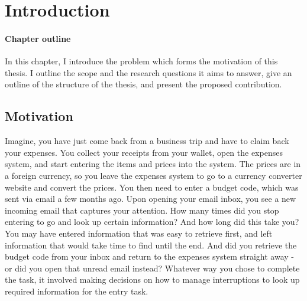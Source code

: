 \chapter{Introduction}

\begin{mynote}
\subsubsection{Chapter outline}
In this chapter, I introduce the problem which forms the motivation of this thesis. I outline the scope and the research questions it aims to answer, give an outline of the structure of the thesis, and present the proposed contribution.
\end{mynote}

\vspace{10pt}

\section{Motivation}

Imagine, you have just come back from a business trip and have to claim back your expenses. You collect your receipts from your wallet, open the expenses system, and start entering the items and prices into the system. The prices are in a foreign currency, so you leave the expenses system to go to a currency converter website and convert the prices. You then need to enter a budget code, which was sent via email a few months ago. Upon opening your email inbox, you see a new incoming email that captures your attention. How many times did you stop entering to go and look up certain information? And how long did this take you? You may have entered information that was easy to retrieve first, and left information that would take time to find until the end. And did you retrieve the budget code from your inbox and return to the expenses system straight away - or did you open that unread email instead? Whatever way you chose to complete the task, it involved making decisions on how to manage interruptions to look up required information for the entry task. 

